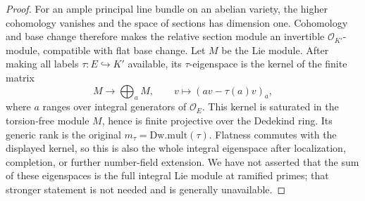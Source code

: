 \documentclass[11pt,a4paper]{article}
\numberwithin{equation}{section}
\theoremstyle{remark}\newtheorem{remark}[theorem]{Remark}
\begin{document}
\begin{proof}
For an ample principal line bundle on an abelian variety,
the higher cohomology vanishes and the space of sections has
dimension one.  Cohomology and base change therefore makes
the relative section module an invertible
\(\mathcal O_{K'}\)-module, compatible with flat base change.
Let \(M\) be the Lie module.  After making all labels
\(\tau:E\hookrightarrow K'\) available, its \(\tau\)-eigenspace
is the kernel of the finite matrix
\[
 M\longrightarrow\bigoplus_a M,\qquad
 v\longmapsto (av-\tau(a)v)_a,
\]
where \(a\) ranges over integral generators of
\(\mathcal O_E\).  This kernel is saturated in the torsion-free
module \(M\), hence is finite projective over the Dedekind
ring.  Its generic rank is the original \(m_\tau=\mathrm{Dw.mult}(\tau)\).
Flatness commutes with the displayed kernel, so this is also
the whole integral eigenspace after localization, completion,
or further number-field extension.  We have not asserted
that the sum of these eigenspaces is the full integral Lie
module at ramified primes; that stronger statement is not
needed and is generally unavailable.
\end{proof}

\end{document}
